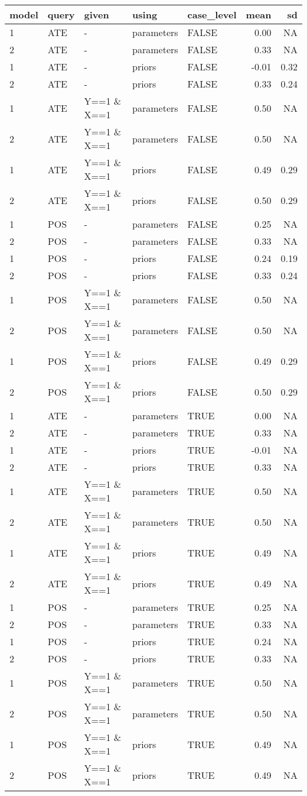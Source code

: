 \documentclass[
  11pt,
  article]{jss}
\begin{document}
\begin{tabular}{l|l|l|l|l|r|r}
\hline
model & query & given & using & case\_level & mean & sd\\
\hline
1 & ATE & - & parameters & FALSE & 0.00 & NA\\
\hline
2 & ATE & - & parameters & FALSE & 0.33 & NA\\
\hline
1 & ATE & - & priors & FALSE & -0.01 & 0.32\\
\hline
2 & ATE & - & priors & FALSE & 0.33 & 0.24\\
\hline
1 & ATE & Y==1 \& X==1 & parameters & FALSE & 0.50 & NA\\
\hline
2 & ATE & Y==1 \& X==1 & parameters & FALSE & 0.50 & NA\\
\hline
1 & ATE & Y==1 \& X==1 & priors & FALSE & 0.49 & 0.29\\
\hline
2 & ATE & Y==1 \& X==1 & priors & FALSE & 0.50 & 0.29\\
\hline
1 & POS & - & parameters & FALSE & 0.25 & NA\\
\hline
2 & POS & - & parameters & FALSE & 0.33 & NA\\
\hline
1 & POS & - & priors & FALSE & 0.24 & 0.19\\
\hline
2 & POS & - & priors & FALSE & 0.33 & 0.24\\
\hline
1 & POS & Y==1 \& X==1 & parameters & FALSE & 0.50 & NA\\
\hline
2 & POS & Y==1 \& X==1 & parameters & FALSE & 0.50 & NA\\
\hline
1 & POS & Y==1 \& X==1 & priors & FALSE & 0.49 & 0.29\\
\hline
2 & POS & Y==1 \& X==1 & priors & FALSE & 0.50 & 0.29\\
\hline
1 & ATE & - & parameters & TRUE & 0.00 & NA\\
\hline
2 & ATE & - & parameters & TRUE & 0.33 & NA\\
\hline
1 & ATE & - & priors & TRUE & -0.01 & NA\\
\hline
2 & ATE & - & priors & TRUE & 0.33 & NA\\
\hline
1 & ATE & Y==1 \& X==1 & parameters & TRUE & 0.50 & NA\\
\hline
2 & ATE & Y==1 \& X==1 & parameters & TRUE & 0.50 & NA\\
\hline
1 & ATE & Y==1 \& X==1 & priors & TRUE & 0.49 & NA\\
\hline
2 & ATE & Y==1 \& X==1 & priors & TRUE & 0.49 & NA\\
\hline
1 & POS & - & parameters & TRUE & 0.25 & NA\\
\hline
2 & POS & - & parameters & TRUE & 0.33 & NA\\
\hline
1 & POS & - & priors & TRUE & 0.24 & NA\\
\hline
2 & POS & - & priors & TRUE & 0.33 & NA\\
\hline
1 & POS & Y==1 \& X==1 & parameters & TRUE & 0.50 & NA\\
\hline
2 & POS & Y==1 \& X==1 & parameters & TRUE & 0.50 & NA\\
\hline
1 & POS & Y==1 \& X==1 & priors & TRUE & 0.49 & NA\\
\hline
2 & POS & Y==1 \& X==1 & priors & TRUE & 0.49 & NA\\
\hline
\end{tabular}
\end{document}
